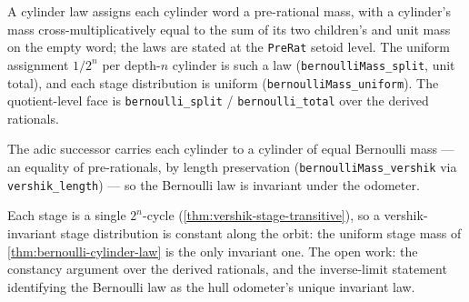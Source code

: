 \begin{proposition}\label{thm:bernoulli-cylinder-law}\leanok{}
A cylinder law assigns each cylinder word a pre-rational mass, with a
cylinder's mass cross-multiplicatively equal to the sum of its two
children's and unit mass on the empty word; the laws are stated at the
\texttt{PreRat} setoid level. The uniform assignment $1/2^n$ per depth-$n$
cylinder is such a law (\texttt{bernoulliMass\_split}, unit total), and
each stage distribution is uniform (\texttt{bernoulliMass\_uniform}). The
quotient-level face is \texttt{bernoulli\_split} /
\texttt{bernoulli\_total} over the derived rationals.
\end{proposition}

\begin{theorem}\label{thm:bernoulli-vershik-invariant}\leanok{}
The adic successor carries each cylinder to a cylinder of equal Bernoulli
mass --- an equality of pre-rationals, by length preservation
(\texttt{bernoulliMass\_vershik} via \texttt{vershik\_length}) --- so the
Bernoulli law is invariant under the odometer.
\end{theorem}

\begin{theorem}\label{thm:odometer-stage-unique-ergodicity}\notready{}
Each stage is a single $2^n$-cycle (\cref{thm:vershik-stage-transitive}),
so a vershik-invariant stage distribution is constant along the orbit: the
uniform stage mass of \cref{thm:bernoulli-cylinder-law} is the only
invariant one. The open work: the constancy argument over the derived
rationals, and the inverse-limit statement identifying the Bernoulli law
as the hull odometer's unique invariant law.
\end{theorem}
